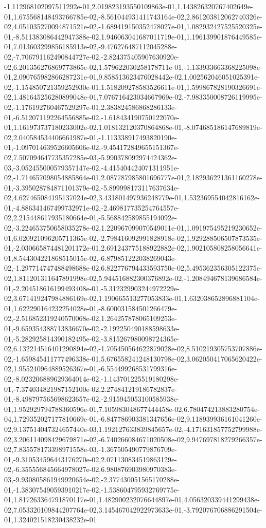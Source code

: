 -1.112968102097511292e-01,2.019823193550109863e-01,1.143826320767402649e-01,1.675568148493766785e-02,-8.561044931411743164e-02,2.861203812062740326e-02,4.051035270094871521e-02,-1.689419150352478027e-01,1.082932427525520325e-01,-8.511383086442947388e-02,1.946063041687011719e-01,1.196139901876449585e-01,7.013603299856185913e-02,-9.476276487112045288e-02,-7.706791162490844727e-02,-2.824375405907630920e-02,6.201356276869773865e-02,1.579622030258178711e-01,-1.133933663368225098e-01,2.090765982866287231e-01,9.858513623476028442e-02,1.002562046051025391e-02,-1.154850721359252930e-01,1.518209278583526611e-01,1.599867828190326691e-02,1.481645256280899048e-01,7.076716423034667969e-02,-7.983350008726119995e-02,-1.176192760467529297e-01,2.383824586868286133e-01,-6.512071192264556885e-02,-1.618434190750122070e-01,1.161973737180233002e-02,1.018132120370864868e-01,-8.074685186147689819e-02,2.040584534406661987e-01,-1.113338917493820190e-01,-1.097014639526605606e-02,-9.454172849655151367e-02,7.507094647735357285e-03,-5.990378092974424362e-03,-3.052455000579357147e-02,-4.415404424071311951e-02,-1.714657098054885864e-01,2.087787985801696777e-01,2.182936221361160278e-01,-3.395028784871101379e-02,-5.899998173117637634e-02,4.627465084195137024e-02,3.431801497936248779e-01,1.532369554042816162e-01,-4.886341467499732971e-02,-2.469817735254764557e-02,2.215448617935180664e-01,-5.568842589855194092e-02,-3.224653750658035278e-02,1.220967099070549011e-01,1.091975495219230652e-01,6.020921096205711365e-02,-2.798416092991828918e-02,1.929288506507873535e-01,-2.030665874481201172e-01,2.691243775188922882e-02,1.902105808258056641e-01,8.544304221868515015e-02,-6.879851222038269043e-02,-1.297714747488498688e-02,6.822776794433593750e-02,5.495362356305122375e-02,1.811201311647891998e-02,5.944516882300376892e-02,-1.208494678139686584e-01,-2.204518616199493408e-01,-5.312329903244972229e-02,3.671419247984886169e-02,1.190665513277053833e-01,1.632038652896881104e-01,1.622290164232254028e-01,-8.600031584501266479e-02,-2.516852319240570068e-02,1.264257878065109253e-01,-9.659354388713836670e-02,-2.192250490188598633e-01,-5.282925814390182495e-02,-3.815267980098724365e-02,6.132214516401290894e-02,-1.705450564622879028e-02,8.510219305753707886e-02,-1.659845411777496338e-01,5.676558241248130798e-02,3.062050417065620422e-02,1.955240964889526367e-01,-6.554499268531799316e-02,-8.023206889629364014e-02,-1.143701225519180298e-01,-7.374034821987152100e-02,2.274841219186782837e-01,-8.498797565698623657e-02,-2.915945053100585938e-01,1.952929794788360596e-01,7.105983048677444458e-02,6.780474213883280754e-04,1.729352027177810669e-01,-6.847786903381347656e-02,9.118939936161041260e-02,9.137514047324657440e-03,1.192127633839845657e-02,-4.171631857752799988e-02,3.206114098429679871e-02,-6.740266084671020508e-02,9.947697818279266357e-02,7.835578173398971558e-03,-1.367505490779876709e-01,-9.310534596443176270e-02,2.071130834519863129e-02,-6.355556845664978027e-02,6.980876903980970383e-03,-9.930805861949920654e-02,-2.377430051565170288e-01,-1.383075490593910217e-02,-1.538604795932769775e-01,1.817263364791870117e-01,1.482900232076644897e-01,4.056320339441299438e-02,7.053320109844207764e-02,3.145467042922973633e-01,-3.792076706886291504e-01,1.324021518230438232e-01
